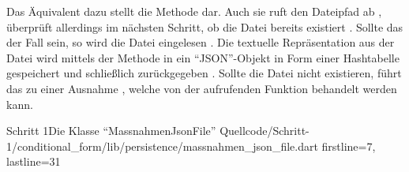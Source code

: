 Das Äquivalent dazu stellt die Methode   dar.
Auch sie ruft den Dateipfad ab , überprüft allerdings im nächsten Schritt, ob die Datei bereits existiert .
Sollte das der Fall sein, so wird die Datei eingelesen .
Die textuelle Repräsentation aus der Datei wird mittels der Methode  in ein \enquote{JSON}-Objekt in Form einer Hashtabelle gespeichert  und schließlich zurückgegeben .
Sollte die Datei nicht existieren, führt das zu einer Ausnahme , welche von der aufrufenden Funktion behandelt werden kann.

\begin{alexlisting}{Schritt 1}{Die Klasse \enquote{MassnahmenJsonFile}}
  {Quellcode/Schritt-1/conditional_form/lib/persistence/massnahmen_json_file.dart}
  {firstline=7, lastline=31}
  \label{lst:Schritt1KlasseMassnahmenJsonFile}
\end{alexlisting}
